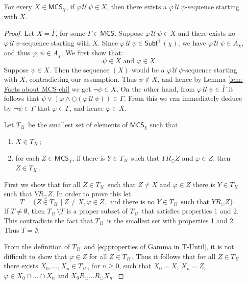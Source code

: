 \documentclass[envcountsect,envcountsame,oribibl,orivec]{llncs}
\newcommand{\lnext}{\bigcirc}
\newcommand{\luntil}{{\,\mathcal{U}\,}}
\renewcommand{\phi}{\varphi}
\newcommand{\Subf}{\mathsf{Subf}}
\newcommand{\MCS}{\mathsf{MCS}}
\begin{document}
\begin{lemma}\label{lem:until-sequence}
	For every $X \in \MCS_\chi$, if $\phi \luntil \psi \in X$, then there exists a  $\phi \luntil \psi$-sequence starting with $X$.
\end{lemma}
\begin{proof}
	Let $X = \overline{\Gamma}$, for some $\Gamma \in \MCS$. Suppose $\phi \luntil \psi \in X$ and there exists no  $\phi \luntil \psi$-sequence starting with $X$. Since $\phi \luntil \psi \in  \Subf^+(\chi)$, we have $\phi \luntil \psi \in  A_\chi$, and thus $\phi, \psi \in  A_\chi$. We first show that:
	\begin{equation}\label{eq:properties of Gamma in T-Until}
		\neg \psi \in X \text{ and } \phi \in X.
	\end{equation}
	Suppose  $\psi \in X$. Then the sequence $(X)$ would be a $\phi \luntil \psi$-sequence starting with $X$, contradicting our assumption. Thus $\psi \not \in X$, and hence by  Lemma \ref{lem: Facts about MCS-chi} we get $\neg \psi \in X$.  On the other hand, from $\phi \luntil \psi \in \overline{\Gamma}$ it follows that $\psi \vee (\phi \wedge \lnext (\phi \luntil \psi) ) \in \Gamma$. From this we can immediately deduce by $\neg \psi \in \Gamma$ that $\phi \in \Gamma$, and hence $\phi \in X$.
	
	Let $T_\luntil$ be the smallest set of elements of $\MCS_\chi$ such that
	\begin{enumerate}
		\item $X \in T_\luntil$;
		\item for each $Z \in \MCS_\chi$, if there is $Y \in T_\luntil$ such that $Y R_\lnext Z$ and $\phi \in Z$, then $Z \in T_\luntil$.
	\end{enumerate}
	First we show that for all $Z \in T_\luntil$ such that $Z \neq X$ and $\phi \in Z$ there is $Y \in T_\luntil$ such that $Y R_\lnext Z$. In order to prove this let 
	\[
	T = \{ Z \in T_\luntil ~|~ Z \neq X, \phi \in Z, \text{ and there is no } Y \in T_\luntil \text{ such that }  Y R_\lnext Z \}.
	\]
	If $T \neq \emptyset$, then $T_\luntil \setminus T$ is a proper subset of $T_\luntil$ that satisfies properties 1 and 2. This contradicts the fact that $T_\luntil$ is the smallest set with properties 1 and 2. Thus $T = \emptyset$.
	
	From the definition of $T_\luntil$ and \eqref{eq:properties of Gamma in T-Until}, it is not difficult to show that $\phi \in Z$ for all $Z \in T_\luntil$. Thus it follows that for all $Z \in T_\luntil$ there exists $X_0, \ldots,X_n \in T_\luntil$, for $n \geq 0$, such that $X_0 = X$, $X_n = Z$,  $\phi \in X_0 \cap \ldots \cap X_n$ and $X_0 R_\lnext \ldots R_\lnext X_n.$
	

\end{proof}
\end{document}
